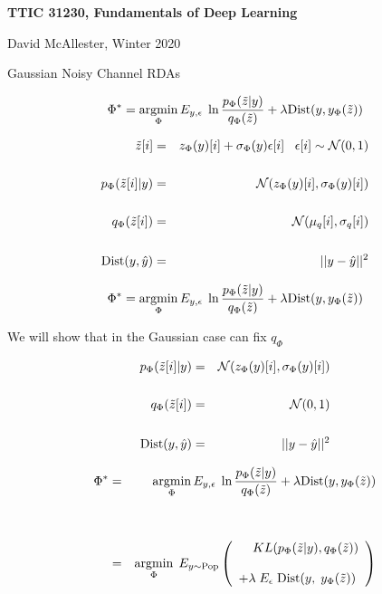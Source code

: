 





{\Huge

  \centerline{\bf TTIC 31230, Fundamentals of Deep Learning}
  \bigskip
  \centerline{David McAllester, Winter 2020}
  \vfill
  \centerline{Gaussian Noisy Channel RDAs}
  \vfill
  \vfill
  
$$\Phi^* = \operatorname*{argmin}_\Phi E_{y,\epsilon}\;\ln \frac{p_\Phi(\tilde{z}|y)}{q_\Phi(\tilde{z})} + \lambda \mathrm{Dist}(y,y_\Phi(\tilde{z}))$$

{\color{red}
\begin{eqnarray*}
\tilde{z}[i] & = & z_\Phi(y)[i] + \sigma_\Phi(y)\epsilon[i]\;\;\;\epsilon[i] \sim {\cal N}(0,1) \\
\\
p_\Phi(\tilde{z}[i]|y) & = & {\cal N}(z_\Phi(y)[i],\sigma_\Phi(y)[i]) \\
\\
q_\Phi(\tilde{z}[i]) & = & {\cal N}(\mu_q[i],\sigma_q[i]) \\
\\
\mathrm{Dist}(y,\hat{y}) & = & ||y-\hat{y}||^2
\end{eqnarray*}
}


$$\Phi^* = \operatorname*{argmin}_\Phi E_{y,\epsilon}\;\ln \frac{p_\Phi(\tilde{z}|y)}{q_\Phi(\tilde{z})} + \lambda \mathrm{Dist}(y,y_\Phi(\tilde{z}))$$

\vfill
We will show that in the Gaussian case can fix $q_\Phi$

{\color{red}
\begin{eqnarray*}
p_\Phi(\tilde{z}[i]|y) & = & {\cal N}(z_\Phi(y)[i],\sigma_\Phi(y)[i]) \\
\\
q_\Phi(\tilde{z}[i]) & = & {\cal N}(0,1) \\
\\
\mathrm{Dist}(y,\hat{y}) & = & ||y-\hat{y}||^2
\end{eqnarray*}
}



\begin{eqnarray*}
\Phi^* &  = & \operatorname*{argmin}_\Phi E_{y,\epsilon}\;\ln \frac{p_\Phi(\tilde{z}|y)}{q_\Phi(\tilde{z})} + \lambda \mathrm{Dist}(y,y_\Phi(\tilde{z})) \\
\\
\\
& = & \operatorname*{argmin}_{\Phi}\;E_{y\sim \mathrm{Pop}} \left(\begin{array}{l}\;\;\;\;KL(p_\Phi(\tilde{z}|y),q_\Phi(\tilde{z})) \\
\\
+ \lambda \; E_\epsilon\;\mathrm{Dist}(y,\;y_\Phi(\tilde{z}))\end{array}\right)
\end{eqnarray*}

}
